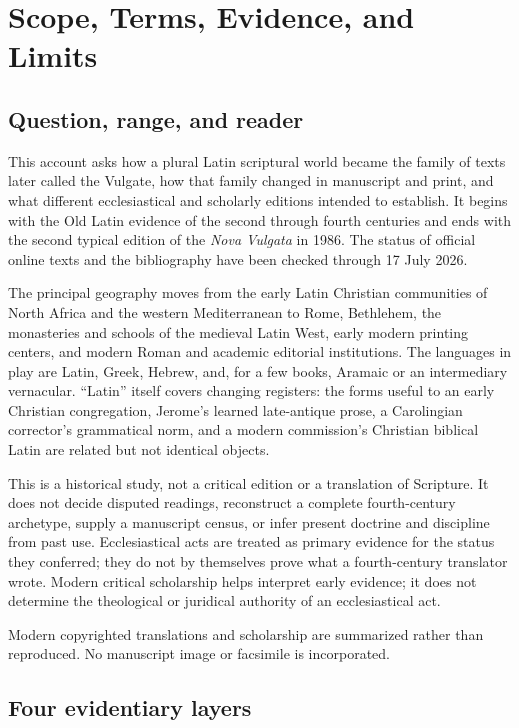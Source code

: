 \section{Scope, Terms, Evidence, and Limits}

\subsection{Question, range, and reader}

This account asks how a plural Latin scriptural world became the family of texts later called the Vulgate, how that family changed in manuscript and print, and what different ecclesiastical and scholarly editions intended to establish. It begins with the Old Latin evidence of the second through fourth centuries and ends with the second typical edition of the \emph{Nova Vulgata} in 1986. The status of official online texts and the bibliography have been checked through 17 July 2026.

The principal geography moves from the early Latin Christian communities of North Africa and the western Mediterranean to Rome, Bethlehem, the monasteries and schools of the medieval Latin West, early modern printing centers, and modern Roman and academic editorial institutions. The languages in play are Latin, Greek, Hebrew, and, for a few books, Aramaic or an intermediary vernacular. ``Latin'' itself covers changing registers: the forms useful to an early Christian congregation, Jerome's learned late-antique prose, a Carolingian corrector's grammatical norm, and a modern commission's Christian biblical Latin are related but not identical objects.

This is a historical study, not a critical edition or a translation of Scripture. It does not decide disputed readings, reconstruct a complete fourth-century archetype, supply a manuscript census, or infer present doctrine and discipline from past use. Ecclesiastical acts are treated as primary evidence for the status they conferred; they do not by themselves prove what a fourth-century translator wrote. Modern critical scholarship helps interpret early evidence; it does not determine the theological or juridical authority of an ecclesiastical act.

Modern copyrighted translations and scholarship are summarized rather than reproduced. No manuscript image or facsimile is incorporated.

\subsection{Four evidentiary layers}

